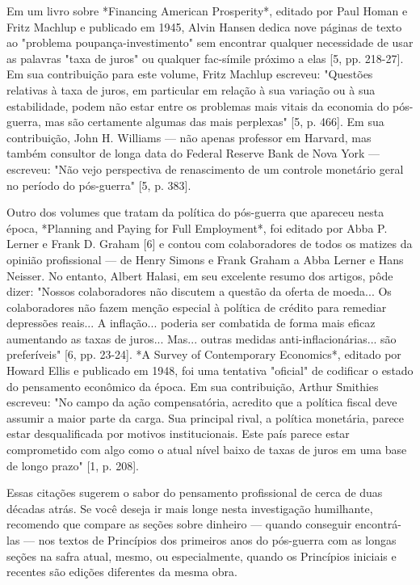 \documentclass[12pt]{article}
\begin{document}
Em um livro sobre *Financing American Prosperity*, editado por Paul Homan e Fritz Machlup e publicado em 1945, Alvin Hansen dedica nove páginas de texto ao "problema poupança-investimento" sem encontrar qualquer necessidade de usar as palavras "taxa de juros" ou qualquer fac-símile próximo a elas [5, pp. 218-27]. Em sua contribuição para este volume, Fritz Machlup escreveu: "Questões relativas à taxa de juros, em particular em relação à sua variação ou à sua estabilidade, podem não estar entre os problemas mais vitais da economia do pós-guerra, mas são certamente algumas das mais perplexas" [5, p. 466]. Em sua contribuição, John H. Williams — não apenas professor em Harvard, mas também consultor de longa data do Federal Reserve Bank de Nova York — escreveu: "Não vejo perspectiva de renascimento de um controle monetário geral no período do pós-guerra" [5, p. 383].

Outro dos volumes que tratam da política do pós-guerra que apareceu nesta época, *Planning and Paying for Full Employment*, foi editado por Abba P. Lerner e Frank D. Graham [6] e contou com colaboradores de todos os matizes da opinião profissional — de Henry Simons e Frank Graham a Abba Lerner e Hans Neisser. No entanto, Albert Halasi, em seu excelente resumo dos artigos, pôde dizer: "Nossos colaboradores não discutem a questão da oferta de moeda... Os colaboradores não fazem menção especial à política de crédito para remediar depressões reais... A inflação... poderia ser combatida de forma mais eficaz aumentando as taxas de juros... Mas... outras medidas anti-inflacionárias... são preferíveis" [6, pp. 23-24]. *A Survey of Contemporary Economics*, editado por Howard Ellis e publicado em 1948, foi uma tentativa "oficial" de codificar o estado do pensamento econômico da época. Em sua contribuição, Arthur Smithies escreveu: "No campo da ação compensatória, acredito que a política fiscal deve assumir a maior parte da carga. Sua principal rival, a política monetária, parece estar desqualificada por motivos institucionais. Este país parece estar comprometido com algo como o atual nível baixo de taxas de juros em uma base de longo prazo" [1, p. 208].

Essas citações sugerem o sabor do pensamento profissional de cerca de duas décadas atrás. Se você deseja ir mais longe nesta investigação humilhante, recomendo que compare as seções sobre dinheiro — quando conseguir encontrá-las — nos textos de Princípios dos primeiros anos do pós-guerra com as longas seções na safra atual, mesmo, ou especialmente, quando os Princípios iniciais e recentes são edições diferentes da mesma obra.
\end{document}
